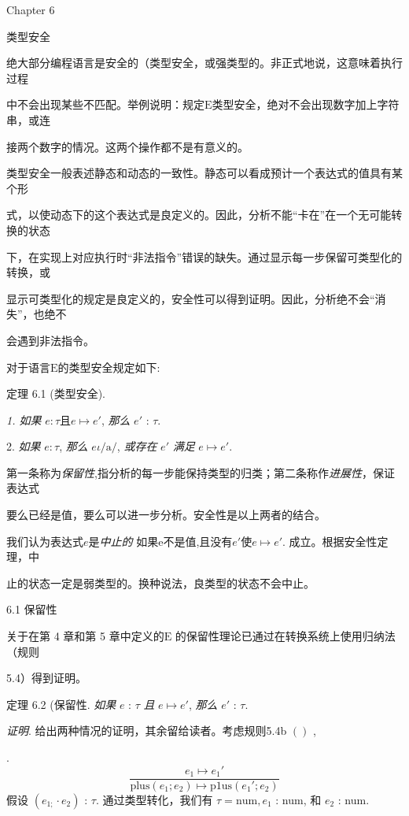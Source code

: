 
Chapter 6

类型安全

绝大部分编程语言是安全的（类型安全，或强类型的。非正式地说，这意味着执行过程

中不会出现某些不匹配。举例说明：规定$\mathrm{E}$类型安全，绝对不会出现数字加上字符串，或连

接两个数字的情况。这两个操作都不是有意义的。

类型安全一般表述静态和动态的一致性。静态可以看成预计一个表达式的值具有某个形

式，以使动态下的这个表达式是良定义的。因此，分析不能“卡在”在一个无可能转换的状态

下，在实现上对应执行时“非法指令”错误的缺失。通过显示每一步保留可类型化的转换，或

显示可类型化的规定是良定义的，安全性可以得到证明。因此，分析绝不会“消失”，也绝不

会遇到非法指令。

对于语言$\mathrm{E}$的类型安全规定如下:

定理 6.1 (类型安全).

{\it 1. 如果} $e:\tau  且e\mapsto e'$, {\it 那么} $e'$ : $\tau.$

2. {\it 如果} $ e:\tau$, {\it 那么} $e\iota/\mathrm{a}/$, {\it 或存在} $e'$ {\it 满足} $e\mapsto e'.$

第一条称为{\it 保留性},指分析的每一步能保持类型的归类；第二条称作{\it 进展性}，保证表达式

要么已经是值，要么可以进一步分析。安全性是以上两者的结合。

我们认为表达式$e$是{\it 中止的} 如果e不是值,且没有$e'$使$e\mapsto e'$. 成立。根据安全性定理，中

止的状态一定是弱类型的。换种说法，良类型的状态不会中止。

6.1 保留性

关于在第 4 章和第 5 章中定义的$\mathrm{E}$ 的保留性理论已通过在转换系统上使用归纳法（规则


5.4）得到证明。

定理  6.2 (保留性. {\it 如果} $e$ : $\tau$ {\it 且} $e\mapsto e'$, {\it 那么} $e'$ : $\tau.$

{\it 证明}. 给出两种情况的证明，其余留给读者。考虑规则5.4b $()$ ,

.
$$
\frac{e_{1}\mapsto e_{1}'}{\mathrm{p}\mathrm{l}\mathrm{u}\mathrm{s}(e_{1};e_{2})\mapsto \mathrm{p}1\mathrm{u}\mathrm{s}(e_{1}';e_{2})}
$$
假设 $(e_{1;}\cdot e_{2})$ : $\tau$. 通过类型转化，我们有 $\tau=\mathrm{n}\mathrm{u}\mathrm{m}, e_{1}$ : num, 和 $e_{2}$ : num.

